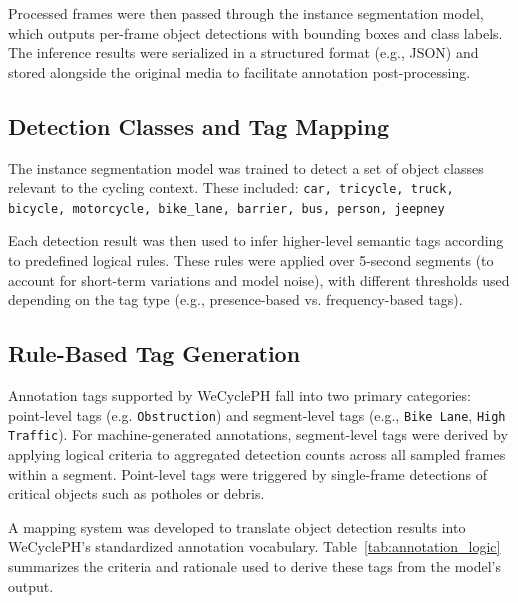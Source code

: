 Processed frames were then passed through the instance segmentation model, which outputs per-frame object detections with bounding boxes and class labels. The inference results were serialized in a structured format (e.g., JSON) and stored alongside the original media to facilitate annotation post-processing.

\subsection{Detection Classes and Tag Mapping}

The instance segmentation model was trained to detect a set of object classes relevant to the cycling context. These included: \texttt{car, tricycle, truck, bicycle, motorcycle, bike\_lane, barrier, bus, person, jeepney}
    
Each detection result was then used to infer higher-level semantic tags according to predefined logical rules. These rules were applied over 5-second segments (to account for short-term variations and model noise), with different thresholds used depending on the tag type (e.g., presence-based vs. frequency-based tags).

\subsection{Rule-Based Tag Generation}

Annotation tags supported by WeCyclePH fall into two primary categories: point-level tags (e.g. \texttt{Obstruction}) and segment-level tags (e.g., \texttt{Bike Lane}, \texttt{High Traffic}). For machine-generated annotations, segment-level tags were derived by applying logical criteria to aggregated detection counts across all sampled frames within a segment. Point-level tags were triggered by single-frame detections of critical objects such as potholes or debris.

A mapping system was developed to translate object detection results into WeCyclePH's standardized annotation vocabulary. Table~\ref{tab:annotation_logic} summarizes the criteria and rationale used to derive these tags from the model's output.

